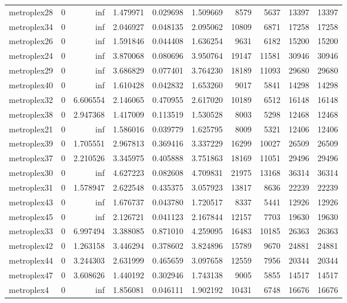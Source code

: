 \begin{longtable}{|l|r|r|r|r|r|r|r|r|r|}
metroplex28 & 0 & inf & 1.479971 & 0.029698 & 1.509669 & 8579 & 5637 & 13397 & 13397 \\
metroplex34 & 0 & inf & 2.046927 & 0.048135 & 2.095062 & 10809 & 6871 & 17258 & 17258 \\
metroplex26 & 0 & inf & 1.591846 & 0.044408 & 1.636254 & 9631 & 6182 & 15200 & 15200 \\
metroplex24 & 0 & inf & 3.870068 & 0.080696 & 3.950764 & 19147 & 11581 & 30946 & 30946 \\
metroplex29 & 0 & inf & 3.686829 & 0.077401 & 3.764230 & 18189 & 11093 & 29680 & 29680 \\
metroplex40 & 0 & inf & 1.610428 & 0.042832 & 1.653260 & 9017 & 5841 & 14298 & 14298 \\
metroplex32 & 0 & 6.606554 & 2.146065 & 0.470955 & 2.617020 & 10189 & 6512 & 16148 & 16148 \\
metroplex38 & 0 & 2.947368 & 1.417009 & 0.113519 & 1.530528 & 8003 & 5298 & 12468 & 12468 \\
metroplex21 & 0 & inf & 1.586016 & 0.039779 & 1.625795 & 8009 & 5321 & 12406 & 12406 \\
metroplex39 & 0 & 1.705551 & 2.967813 & 0.369416 & 3.337229 & 16299 & 10027 & 26509 & 26509 \\
metroplex37 & 0 & 2.210526 & 3.345975 & 0.405888 & 3.751863 & 18169 & 11051 & 29496 & 29496 \\
metroplex30 & 0 & inf & 4.627223 & 0.082608 & 4.709831 & 21975 & 13168 & 36314 & 36314 \\
metroplex31 & 0 & 1.578947 & 2.622548 & 0.435375 & 3.057923 & 13817 & 8636 & 22239 & 22239 \\
metroplex43 & 0 & inf & 1.676737 & 0.043780 & 1.720517 & 8337 & 5441 & 12926 & 12926 \\
metroplex45 & 0 & inf & 2.126721 & 0.041123 & 2.167844 & 12157 & 7703 & 19630 & 19630 \\
metroplex33 & 0 & 6.997494 & 3.388085 & 0.871010 & 4.259095 & 16483 & 10185 & 26363 & 26363 \\
metroplex42 & 0 & 1.263158 & 3.446294 & 0.378602 & 3.824896 & 15789 & 9670 & 24881 & 24881 \\
metroplex44 & 0 & 3.244303 & 2.631999 & 0.465659 & 3.097658 & 12559 & 7956 & 20344 & 20344 \\
metroplex47 & 0 & 3.608626 & 1.440192 & 0.302946 & 1.743138 & 9005 & 5855 & 14517 & 14517 \\
metroplex4 & 0 & inf & 1.856081 & 0.046111 & 1.902192 & 10431 & 6748 & 16676 & 16676 \\

\end{longtable}
